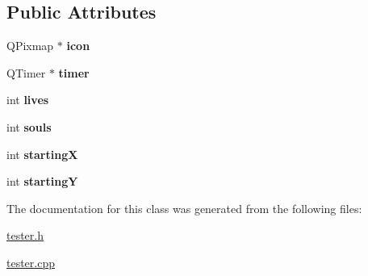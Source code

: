 \subsection*{Public Attributes}
\begin{DoxyCompactItemize}
\item 
\hypertarget{classTester_a893d45f8f768403c93e0892668744cf1}{Q\-Pixmap $\ast$ {\bfseries icon}}\label{classTester_a893d45f8f768403c93e0892668744cf1}

\item 
\hypertarget{classTester_ad1d75f921be24ad1c4ca52250f631655}{Q\-Timer $\ast$ {\bfseries timer}}\label{classTester_ad1d75f921be24ad1c4ca52250f631655}

\item 
\hypertarget{classTester_a59495affb31a5fa5daa0fe96ef5bfa28}{int {\bfseries lives}}\label{classTester_a59495affb31a5fa5daa0fe96ef5bfa28}

\item 
\hypertarget{classTester_af42e09fb691bbbf3ba2fd0826e2c84bd}{int {\bfseries souls}}\label{classTester_af42e09fb691bbbf3ba2fd0826e2c84bd}

\item 
\hypertarget{classTester_af967debae52b5edefbd81b8c6feab26b}{int {\bfseries starting\-X}}\label{classTester_af967debae52b5edefbd81b8c6feab26b}

\item 
\hypertarget{classTester_a56259a760a37339190abe1d41f4a270c}{int {\bfseries starting\-Y}}\label{classTester_a56259a760a37339190abe1d41f4a270c}

\end{DoxyCompactItemize}


The documentation for this class was generated from the following files\-:\begin{DoxyCompactItemize}
\item 
\hyperlink{tester_8h}{tester.\-h}\item 
\hyperlink{tester_8cpp}{tester.\-cpp}\end{DoxyCompactItemize}
